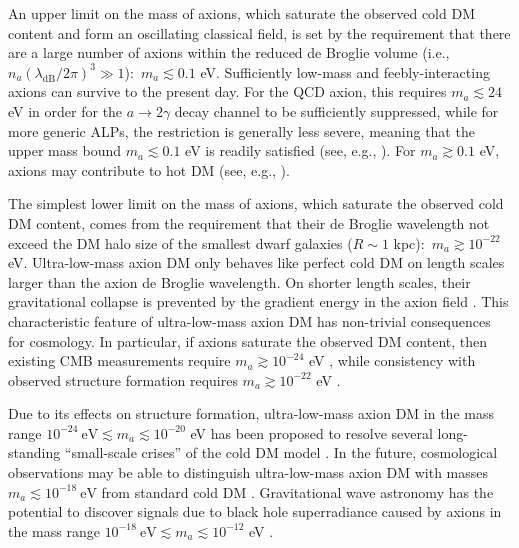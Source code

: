An upper limit on the mass of axions, which saturate the observed cold DM content and form an oscillating classical field, is set by the requirement that there are a large number of axions within the reduced de Broglie volume (i.e., $n_a \left( \lambda_{\textrm{dB}}/2\pi \right)^3 \gg 1$):~$m_a \lesssim 0.1$ eV.
Sufficiently low-mass and feebly-interacting axions can survive to the present day.
For the QCD axion, this requires $m_a \lesssim 24$ eV in order for the $a \to 2 \gamma$ decay channel to be sufficiently suppressed, while for more generic ALPs, the restriction is generally less severe, meaning that the upper mass bound $m_a \lesssim 0.1$ eV is readily satisfied (see, e.g., \cite{Fields2015ALP_decay}).
For $m_a \gtrsim 0.1$ eV, axions may contribute to hot DM (see, e.g., \cite{Archidiacono2013_hot_axion_DM}).

The simplest lower limit on the mass of axions, which saturate the observed cold DM content, comes from the requirement that their de Broglie wavelength not exceed the DM halo size of the smallest dwarf galaxies ($R \sim 1$ kpc):~$m_a \gtrsim 10^{-22}$ eV.
Ultra-low-mass axion DM only behaves like perfect cold DM on length scales larger than the axion de Broglie wavelength.
On shorter length scales, their gravitational collapse is prevented by the gradient energy in the axion field \cite{Khlopov1985}.
This characteristic feature of ultra-low-mass axion DM has non-trivial consequences for cosmology.
In particular, if axions saturate the observed DM content, then existing CMB measurements require $m_a \gtrsim 10^{-24}$ eV \cite{Marsh2015A}, while consistency with observed structure formation requires $m_a \gtrsim 10^{-22}$ eV \cite{Marsh2015B,Schive2015}.

Due to its effects on structure formation, ultra-low-mass axion DM in the mass range $10^{-24}~\textrm{eV} \lesssim m_a  \lesssim 10^{-20}$ eV has been proposed to resolve several long-standing ``small-scale crises'' of the cold DM model \cite{Hu2000,Marsh2014,Paredes2015}.
In the future, cosmological observations may be able to distinguish ultra-low-mass axion DM with masses $m_a \lesssim 10^{-18}~\textrm{eV}$ from standard cold DM \cite{Marsh2015C}. Gravitational wave astronomy \cite{LIGO2016} has the potential to discover signals due to black hole superradiance caused by axions in the mass range $10^{-18}~\textrm{eV} \lesssim m_a  \lesssim 10^{-12}$ eV \cite{Marsh2015Review,Arvanitaki2010}.


